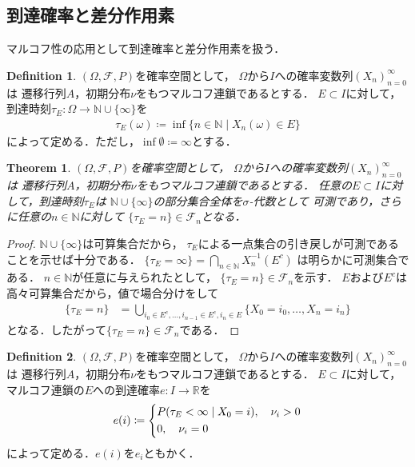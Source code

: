\documentclass[dvipdfmx,autodetect-engine]{jsarticle}
\newtheorem{theorem}{Theorem}[section]
\theoremstyle{remark}
\theoremstyle{definition}
\newtheorem{definition}{Definition}[section]
\newcommand{\R}{\mathbb{R}}
\newcommand{\N}{\mathbb{N}}
\begin{document}
\subsection{到達確率と差分作用素}
マルコフ性の応用として到達確率と差分作用素を扱う．


\begin{definition}
    $(\Omega,\mathcal{F},P)$を確率空間として，
    $\Omega$から$I$への確率変数列$(X_n)_{n=0}^{\infty}$は
    遷移行列$A$，初期分布$\nu$をもつマルコフ連鎖であるとする．
    $E \subset I$に対して，到達時刻$\tau_{E} \colon \Omega \to \N \cup \{\infty \}$を
    \begin{align}
        \tau_{E}(\omega) \coloneqq \inf\{n \in \N \mid X_n(\omega) \in E\}
    \end{align}
    によって定める．ただし，$\inf \emptyset \coloneqq \infty$とする．
\end{definition}


\begin{theorem}
    $(\Omega,\mathcal{F},P)$を確率空間として，
    $\Omega$から$I$への確率変数列$(X_n)_{n=0}^{\infty}$は
    遷移行列$A$，初期分布$\nu$をもつマルコフ連鎖であるとする．
    任意の$E \subset I$に対して，到達時刻$\tau_{E}$は
    $\N \cup \{\infty \}$の部分集合全体を$\sigma$-代数として
    可測であり，さらに任意の$n \in \N$に対して
    $\{\tau_{E} = n\} \in \mathcal{F}_n$となる．
\end{theorem}

\begin{proof}
    $\N \cup \{ \infty\}$は可算集合だから，
    $\tau_{E}$による一点集合の引き戻しが可測であることを示せば十分である．
    $\{\tau_{E} = \infty \} = \bigcap_{n\in \N} X_n^{-1} (E^{c})$
    は明らかに可測集合である．
    $n \in \N$が任意に与えられたとして，
    $\{\tau_{E} = n \} \in \mathcal{F}_n$を示す．
    $E$および$E^c$は高々可算集合だから，値で場合分けをして
    \begin{align}
        \{\tau_{E} = n\} &= 
        \bigcup_{i_0 \in E^{c} ,\ldots, i_{n-1} \in E^{c},i_n \in E}
        \{X_0 = i_0,\ldots, X_n = i_n\} 
    \end{align}
    となる．したがって$\{\tau_{E} = n\} \in \mathcal{F}_n$である．
\end{proof}


\begin{definition}
    $(\Omega,\mathcal{F},P)$を確率空間として，
    $\Omega$から$I$への確率変数列$(X_n)_{n=0}^{\infty}$は
    遷移行列$A$，初期分布$\nu$をもつマルコフ連鎖であるとする．
    $E \subset I$に対して，
    マルコフ連鎖の$E$への到達確率$e\colon I \to \R$を
    \begin{align}
        e(i) \coloneqq
        \begin{dcases}
            P(\tau_{E} <\infty \mid X_0=i), \quad \nu_i >0 \\
            0, \quad \nu_i = 0
        \end{dcases}
    \end{align}
    によって定める．$e(i)$を$e_i$ともかく．
\end{definition}
\end{document}
